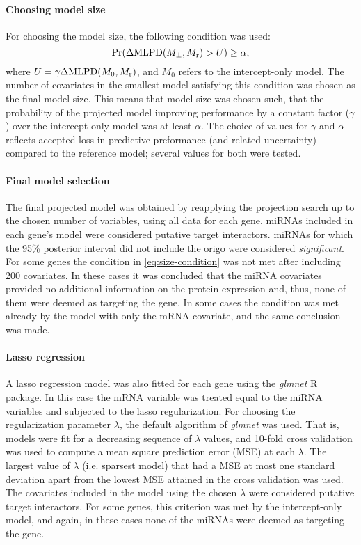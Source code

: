 \paragraph{Choosing model size}
For choosing the model size, the following condition was used:
\begin{equation}
	\label{eq:size-condition}
	\textup{Pr}(\Delta \textup{MLPD}(M_\perp,M_{\textup{r}}) > U) \geq \alpha,
\end{equation}
where $U = \gamma \Delta \textup{MLPD}(M_0,M_{\textup{r}})$, and $M_0$
refers to the intercept-only model. The number of covariates in the smallest model satisfying this condition
was chosen as the final model size. This means that model size was chosen
such, that the probability of the projected model improving performance
by a constant factor ($\gamma$) over the intercept-only model
was at least $\alpha$. The choice of values for $\gamma$ and $\alpha$
reflects accepted loss in predictive preformance (and related
uncertainty) compared to the reference model; several values for
both were tested.

\paragraph{Final model selection}
The final projected model was obtained by reapplying the projection search up to
the chosen number of variables, using all data for each gene. miRNAs included
in each gene's model were considered putative target interactors. miRNAs for
which the 95\% posterior interval did not include the origo were considered
\emph{significant}. For some genes the condition in \eqref{eq:size-condition} was not
met after including 200 covariates. In these cases it was concluded that the
miRNA covariates provided no additional information on the protein expression
and, thus, none of them were deemed as targeting the gene. In some cases the
condition was met already by the model with only the mRNA covariate, and the
same conclusion was made.

\paragraph{Lasso regression}
A lasso regression model was also fitted for each gene using the
\emph{glmnet} R package. In this case the mRNA variable was treated equal
to the miRNA variables and subjected to the lasso regularization. For choosing
the regularization parameter $\lambda$, the default algorithm of \emph{glmnet}
was used. That is, models were fit for a decreasing sequence of $\lambda$
values, and 10-fold cross validation was used to compute a mean square
prediction error (MSE) at each $\lambda$. The largest value of $\lambda$ (i.e.
sparsest model) that had a MSE at most one standard deviation apart from the
lowest MSE attained in the cross validation was used. The covariates included
in the model using the chosen $\lambda$ were considered putative target
interactors. For some genes, this criterion was met by the intercept-only
model, and again, in these cases none of the miRNAs were deemed as targeting
the gene.



